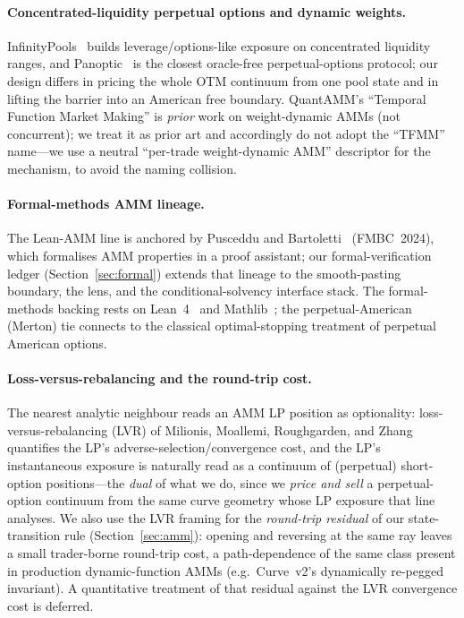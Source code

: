 \documentclass[runningheads]{llncs}
\begin{document}
\paragraph{Concentrated-liquidity perpetual options and dynamic weights.}
InfinityPools~\cite{infinitypools} builds leverage/options-like exposure on
concentrated liquidity ranges, and Panoptic~\cite{panoptic} is the closest
oracle-free perpetual-options protocol; our design differs in pricing the whole
OTM continuum from one pool state and in lifting the barrier into an American free
boundary. QuantAMM's ``Temporal Function Market Making'' is \emph{prior} work on
weight-dynamic AMMs (not concurrent); we treat it as prior art and accordingly do
not adopt the ``TFMM'' name---we use a
neutral ``per-trade weight-dynamic AMM'' descriptor for the mechanism, to avoid
the naming collision.

\paragraph{Formal-methods AMM lineage.}
The Lean-AMM line is anchored by Pusceddu and
Bartoletti~\cite{pusceddu-bartoletti} (FMBC~2024), which formalises AMM
properties in a proof assistant; our formal-verification ledger
(Section~\ref{sec:formal}) extends that lineage to the smooth-pasting boundary,
the lens, and the conditional-solvency interface stack. The formal-methods backing
rests on Lean~4~\cite{lean4} and Mathlib~\cite{mathlib}; the perpetual-American
(Merton) tie connects to the classical optimal-stopping treatment of perpetual
American options.

\paragraph{Loss-versus-rebalancing and the round-trip cost.}
The nearest analytic neighbour reads an AMM LP position as
optionality: loss-versus-rebalancing (LVR) of
Milionis, Moallemi, Roughgarden, and Zhang~\cite{lvr} quantifies the LP's
adverse-selection/convergence cost, and the LP's instantaneous exposure is
naturally read as a continuum of (perpetual) short-option positions---the
\emph{dual} of what we do, since we \emph{price and sell} a perpetual-option
continuum from the same curve geometry whose LP exposure that line analyses. We
also use the LVR framing for the \emph{round-trip residual} of our state-transition
rule (Section~\ref{sec:amm}): opening and reversing at the same ray leaves a small
trader-borne round-trip cost, a path-dependence of the same class present in
production dynamic-function AMMs (e.g.\ Curve~v2's dynamically re-pegged
invariant). A quantitative treatment of that residual against the LVR convergence
cost is deferred.
\end{document}
